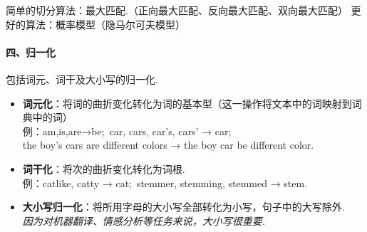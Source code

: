 \documentclass[12pt, a4paper, oneside]{ctexart}
\numberwithin{equation}{section}  %
\begin{document}
简单的切分算法：最大匹配.（正向最大匹配、反向最大匹配、双向最大匹配） 更好的算法：概率模型（隐马尔可夫模型）

\paragraph{四、归一化}包括词元、词干及大小写的归一化.
\begin{itemize}
    \item \textbf{词元化}：将词的曲折变化转化为词的基本型（这一操作将文本中的词映射到词典中的词）\\
    例：am,is,are→be;\ car, cars, car's, cars' → car;\\
    the boy's cars are different colors → the boy car be different color.
    \item \textbf{词干化}：将次的曲折变化转化为词根.\\
    例：catlike, catty → cat;\ stemmer, stemming, stemmed → stem.
    \item \textbf{大小写归一化}：将所用字母的大小写全部转化为小写，句子中的大写除外.\\
    \textit{因为对机器翻译、情感分析等任务来说，大小写很重要.}
\end{itemize}
\end{document}
